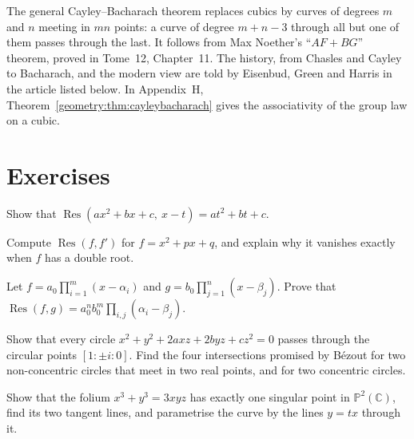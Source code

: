 \begin{remark}
The general Cayley--Bacharach theorem replaces cubics by curves of degrees $m$ and $n$ meeting in $mn$ points: a curve of degree $m+n-3$ through all but one of
them passes through the last. It follows from Max Noether's ``$AF+BG$'' theorem, proved in Tome~12, Chapter~11. The history, from Chasles and Cayley to
Bacharach, and the modern view are told by Eisenbud, Green and Harris in the article listed below. In Appendix~H, Theorem~\ref{geometry:thm:cayleybacharach} gives the
associativity of the group law on a cubic.
\end{remark}

\section{Exercises}

\begin{exercise}[$\star$]\label{geometry:ex:reslinear}
Show that $\operatorname{Res}(ax^2+bx+c,\ x-t)=at^2+bt+c$.
\end{exercise}

\begin{exercise}[$\star$]\label{geometry:ex:discriminant}
Compute $\operatorname{Res}(f,f')$ for $f=x^2+px+q$, and explain why it vanishes exactly when $f$ has a double root.
\end{exercise}

\begin{exercise}[$\star\star$]\label{geometry:ex:resproduct}
Let $f=a_0\prod_{i=1}^m(x-\alpha_i)$ and $g=b_0\prod_{j=1}^n(x-\beta_j)$. Prove that $\operatorname{Res}(f,g)=a_0^nb_0^m\prod_{i,j}(\alpha_i-\beta_j)$.
\end{exercise}

\begin{exercise}[$\star\star$]\label{geometry:ex:circularpoints}
Show that every circle $x^2+y^2+2axz+2byz+cz^2=0$ passes through the circular points $[1:\pm i:0]$. Find the four intersections promised by B\'ezout
for two non-concentric circles that meet in two real points, and for two concentric circles.
\end{exercise}

\begin{exercise}[$\star$]\label{geometry:ex:folium}
Show that the folium $x^3+y^3=3xyz$ has exactly one singular point in $\mathbb P^2(\mathbb C)$, find its two tangent lines, and parametrise the
curve by the lines $y=tx$ through it.
\end{exercise}

